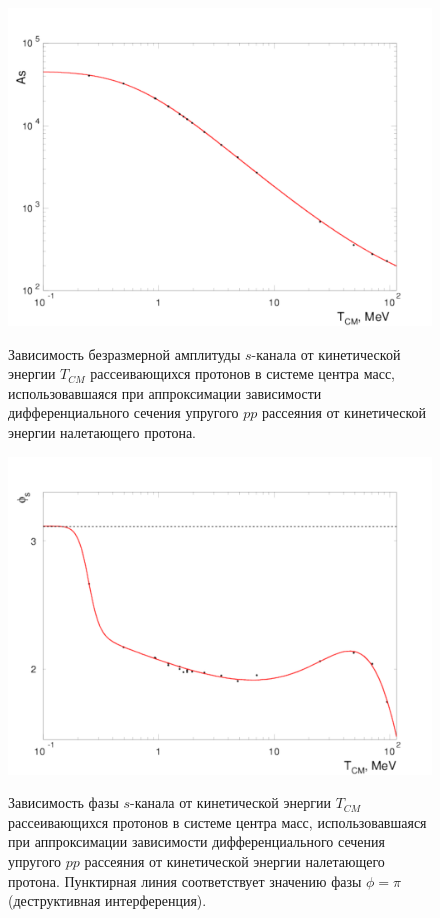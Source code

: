 \documentclass[a4paper,12pt]{article}
\begin{document}
\begin{large}
\begin{figure}[ht]
  {
       \includegraphics[width=0.99\linewidth]{images/1as_pp}
  }
  \caption{Зависимость безразмерной амплитуды $s$-канала от кинетической энергии $T_{CM}$ рассеивающихся протонов в системе центра масс, использовавшаяся при аппроксимации зависимости дифференциального сечения упругого $pp$ рассеяния от кинетической энергии налетающего протона.}
  \label{fig:1as_pp}
\end{figure}

\begin{figure}[ht]
  {
       \includegraphics[width=0.99\linewidth]{images/2phases}
  }
  \caption{Зависимость фазы $s$-канала от кинетической энергии $T_{CM}$ рассеивающихся протонов в системе центра масс, использовавшаяся при аппроксимации зависимости дифференциального сечения упругого $pp$ рассеяния от кинетической энергии налетающего протона. Пунктирная линия соответствует значению фазы $\phi=\pi$ (деструктивная интерференция).}
  \label{fig:2phases_pp}
\end{figure}


\end{large}
\end{document}
